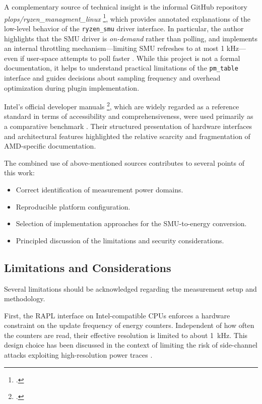 A complementary source of technical insight is the informal GitHub
repository \\\emph{plops/ryzen\_managment\_linux}
\footcite{ryzen_managment_linux}, which provides annotated
explanations of the low-level behavior of the \texttt{ryzen\_smu} driver
interface. In particular, the author highlights that the \gls{SMU} driver is
\emph{on-demand} rather than polling, and implements an internal throttling
mechanism—limiting \gls{SMU} refreshes to at most 1 kHz—even if user-space
attempts to poll faster . While this project
is not a formal documentation, it helps to understand practical limitations of
the \texttt{pm\_table} interface and guides decisions about sampling
frequency and overhead optimization during plugin implementation.

Intel’s official developer manuals \footcite{Intel_SDM}, which are widely
regarded as a reference standard in terms of accessibility and comprehensiveness,
were used primarily as a comparative benchmark . Their structured presentation
of hardware interfaces and architectural features highlighted the relative
scarcity and fragmentation of AMD-specific documentation.

The combined use of above-mentioned sources contributes to several points of this
work:

\begin{itemize}
    \item Correct identification of measurement power domains.
    \item Reproducible platform configuration.
    \item Selection of implementation approaches for the \gls{SMU}-to-energy
        conversion.
    \item Principled discussion of the limitations and security considerations.
\end{itemize}

\subsection{Limitations and Considerations}
\label{sec:limncons}

Several limitations should be acknowledged regarding the measurement setup
and methodology.

First, the \gls{RAPL} interface on Intel-compatible \gls{CPU}s enforces a hardware
constraint on the update frequency of energy counters. Independent of how
often the counters are read, their effective resolution is limited to about
1~kHz. This design choice has been discussed in the context of limiting the
risk of side-channel attacks exploiting high-resolution power traces
\parencite{IntelRAPL, PwrLeak_2023}.


